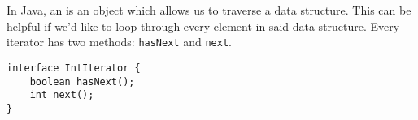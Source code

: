 In Java, an  is an object which allows us to traverse a data
structure. This can be helpful if we'd like to loop through every element in said data structure. 
Every iterator has two methods: \lstinline$hasNext$ and \lstinline$next$.
\vspace{-6mm}
\begin{lstlisting}
interface IntIterator {
    boolean hasNext();
    int next();
}
\end{lstlisting}

